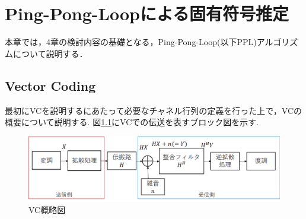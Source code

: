 \chapter{Ping-Pong-Loopによる固有符号推定}
本章では，4章の検討内容の基礎となる，Ping-Pong-Loop(以下PPL)アルゴリズムについて説明する．

\section{Vector Coding}
最初にVCを説明するにあたって必要なチャネル行列の定義を行った上で，VCの概要について説明する.
図\ref{figVC}にVCでの伝送を表すブロック図を示す.

\begin{figure}[t]
    \centering
    \includegraphics[width=\linewidth]{chapter3/figure/VC.eps}
    \caption{VC概略図}
    \label{figVC}
\end{figure}

